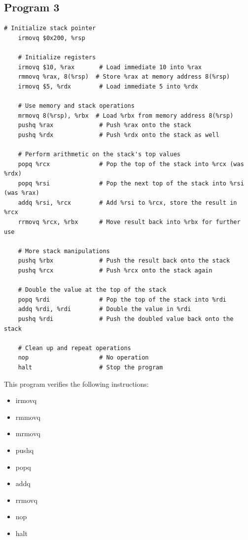 \documentclass{article}
\begin{document}
\subsection{Program 3}

\begin{lstlisting}[language=myassembly]
    # Initialize stack pointer
    irmovq $0x200, %rsp    
    
    # Initialize registers
    irmovq $10, %rax       # Load immediate 10 into %rax
    rmmovq %rax, 8(%rsp)  # Store %rax at memory address 8(%rsp)
    irmovq $5, %rdx        # Load immediate 5 into %rdx
    
    # Use memory and stack operations
    mrmovq 8(%rsp), %rbx  # Load %rbx from memory address 8(%rsp)
    pushq %rax             # Push %rax onto the stack
    pushq %rdx             # Push %rdx onto the stack as well
    
    # Perform arithmetic on the stack's top values
    popq %rcx              # Pop the top of the stack into %rcx (was %rdx)
    popq %rsi              # Pop the next top of the stack into %rsi (was %rax)
    addq %rsi, %rcx        # Add %rsi to %rcx, store the result in %rcx
    rrmovq %rcx, %rbx      # Move result back into %rbx for further use
    
    # More stack manipulations
    pushq %rbx             # Push the result back onto the stack
    pushq %rcx             # Push %rcx onto the stack again
    
    # Double the value at the top of the stack
    popq %rdi              # Pop the top of the stack into %rdi
    addq %rdi, %rdi        # Double the value in %rdi
    pushq %rdi             # Push the doubled value back onto the stack
    
    # Clean up and repeat operations
    nop                    # No operation
    halt                   # Stop the program
\end{lstlisting}

This program verifies the following instructions:
\begin{itemize}
    \item irmovq
    \item rmmovq
    \item mrmovq
    \item pushq
    \item popq
    \item addq
    \item rrmovq
    \item nop
    \item halt
\end{itemize}
\end{document}
